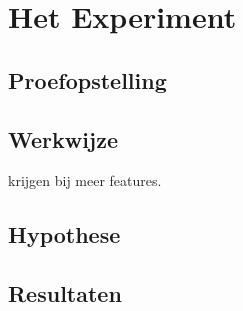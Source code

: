 \chapter{Het Experiment}\label{Het Experiment}


\section{Proefopstelling}\label{Proefopstelling}



\section{Werkwijze}\label{Werkwijze}

krijgen bij meer features.

\section{Hypothese}\label{Hypothese}

\section{Resultaten}\label{Resultaten}

